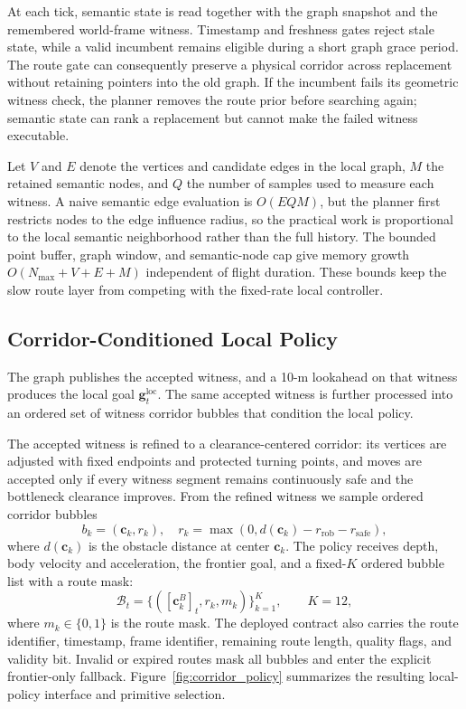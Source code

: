 \documentclass[letterpaper,10pt,conference]{ieeeconf}
\newcommand{\vect}[1]{\boldsymbol{#1}}
\begin{document}
At each tick, semantic state is read together with the graph snapshot and the
remembered world-frame witness.  Timestamp and freshness gates reject stale
state, while a valid incumbent remains eligible during a short graph grace
period.  The route gate can consequently preserve a physical corridor across
replacement without retaining pointers into the old graph.  If the incumbent
fails its geometric witness check, the planner removes the route prior before
searching again; semantic state can rank a replacement but cannot make the
failed witness executable.

Let $V$ and $E$ denote the vertices and candidate edges in the local graph,
$M$ the retained semantic nodes, and $Q$ the number of samples used to measure
each witness.  A naive semantic edge evaluation is $O(EQM)$, but the planner
first restricts nodes to the edge influence radius, so the practical work is
proportional to the local semantic neighborhood rather than the full history.
The bounded point buffer, graph window, and semantic-node cap give memory
growth $O(N_{\max}+V+E+M)$ independent of flight duration.  These bounds keep
the slow route layer from competing with the fixed-rate local controller.

\subsection{Corridor-Conditioned Local Policy}
The graph publishes the accepted witness, and a 10-m lookahead on that
witness produces the local goal $\vect{g}^{\mathrm{loc}}_t$.
The same accepted witness is further processed into an ordered set of
witness corridor bubbles that condition the local policy.

The accepted witness is refined to a clearance-centered corridor: its vertices
are adjusted with fixed endpoints and protected turning points, and moves are
accepted only if every witness segment remains continuously safe and the
bottleneck clearance improves.
From the refined witness we sample ordered corridor bubbles
\begin{equation}
 b_k=(\vect{c}_k,r_k),\quad
 r_k=\max\left(0,d(\vect{c}_k)-r_{\mathrm{rob}}-r_{\mathrm{safe}}\right),
\label{eq:bubble}
\end{equation}
where $d(\vect{c}_k)$ is the obstacle distance at center $\vect{c}_k$.
The policy receives depth, body velocity and acceleration, the frontier goal, and a
fixed-$K$ ordered bubble list with a route mask:
\begin{equation}
 \mathcal{B}_t=\{([\vect{c}_k^{B}]_t,r_k,m_k)\}_{k=1}^{K},
 \qquad K=12,
\label{eq:route_input}
\end{equation}
where $m_k\in\{0,1\}$ is the route mask.  The deployed contract also carries
the route identifier, timestamp, frame identifier, remaining route length,
quality flags, and validity bit.  Invalid or expired routes mask all bubbles
and enter the explicit frontier-only fallback.
Figure~\ref{fig:corridor_policy} summarizes the resulting local-policy
interface and primitive selection.
\end{document}
